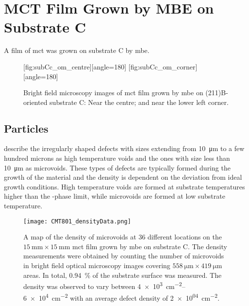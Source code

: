 \clearpage
\section{MCT Film Grown by MBE on  Substrate C}\label{sec:subCc}

A film of \acl{mct} was grown on substrate C by \ac{mbe}. 

\begin{figure}[htbp]
    \centering
    [fig:subCc_om_centre][angle=180]
    \hfill
    [fig:subCc_om_corner][angle=180]
    \caption[Bright field microscopy images of \ac{mct} film grown by \ac{mbe} on substrate AC]{Bright field microscopy images of \ac{mct} film grown by \ac{mbe} on (211)B-oriented substrate C:  Near the centre; and  near the lower left corner.}
    \label{fig:subCc_om}
\end{figure}

\subsection{Particles}

\citet{selvig2007defects} describe the irregularly shaped defects with sizes extending from \SI{10}{\micro\metre} to a few hundred microns as high temperature voids and the ones with size less than \SI{10}{\micro\metre} as microvoids. These types of defects are typically formed during the growth of the material and the density is dependent on the deviation from ideal growth conditions. High temperature voids are formed at substrate temperatures higher than the -phase limit, while microvoids are formed at low substrate temperature.


\begin{figure}[htbp]
    \centering
    \texttt{[image: CMT801\_densityData.png]}
    \caption[Map of the density of microvoids on the \ac{mct} film grown on substrate C.]{A map of the density of microvoids at 36 different locations on the $\SI{15}{\milli\metre}\times\SI{15}{\milli\metre}$ \ac{mct} film grown by \ac{mbe} on substrate C. The density measurements were obtained by counting the number of microvoids in bright field optical microscopy images covering $\SI{558}{\micro\metre}\times\SI{419}{\micro\metre}$ areas. In total, \SI{0.94}{\percent} of the substrate surface was measured. The density was observed to vary between \SIrange{4e+3}{6e+4}{\centi\metre^{-2}} with an average defect density of \SI{2e+04}{\centi\metre^{-2}}.}
    \label{fig:CMT801_densityData}
\end{figure}

